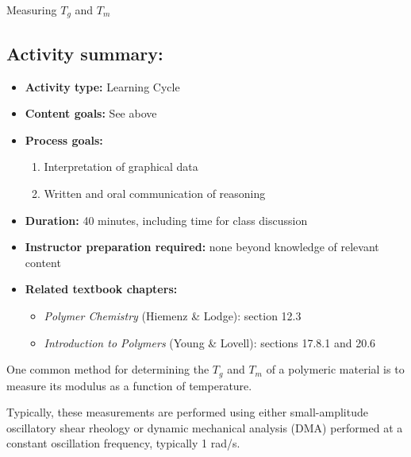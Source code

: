 \begin{activity}{Measuring $T_g$ and $T_m$}
\begin{instructornotes}
	\subsection*{Activity summary:}
	\begin{itemize}
		\item \textbf{Activity type:} Learning Cycle
		\item \textbf{Content goals:} See above %
		\item \textbf{Process goals:} %
			\begin{enumerate}
				\item Interpretation of graphical data
				\item Written and oral communication of reasoning
			\end{enumerate}
		\item \textbf{Duration:} 40 minutes, including time for class discussion
		\item \textbf{Instructor preparation required:} none beyond knowledge of relevant content
		\item \textbf{Related textbook chapters:}
			\begin{itemize}
				\item \emph{Polymer Chemistry} (Hiemenz \& Lodge): section 12.3
				\item \emph{Introduction to Polymers} (Young \& Lovell): sections 17.8.1 and 20.6
			\end{itemize}
	\end{itemize}
	
\end{instructornotes}



\begin{model}
	\label{\labelbase:mdl:DMA}
	
	One common method for determining the $T_g$ and $T_m$ of a polymeric material is to measure its modulus as a function of temperature.
	
	Typically, these measurements are performed using either small-amplitude oscillatory shear rheology or dynamic mechanical analysis (DMA) performed at a constant oscillation frequency, typically 1 rad/s.
	

\end{model}
\end{activity}

